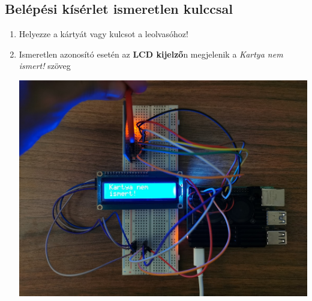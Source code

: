 \documentclass[11pt, a4paper]{article}
\begin{document}
			\subsection{Belépési kísérlet ismeretlen kulccsal}
				\begin{enumerate}
					\justifying
					\item Helyezze a kártyát vagy kulcsot a leolvasóhoz!
					\item Ismeretlen azonosító esetén az \textbf{LCD kijelző}n megjelenik a \emph{Kartya nem ismert!} szöveg \\
					\begin{minipage}{\linewidth}
						\centering
						\includegraphics[width=0.7\linewidth]{img/7_nem_ismert}
						\label{fig:7nemismert}
					\end{minipage}
				\end{enumerate}
\end{document}
